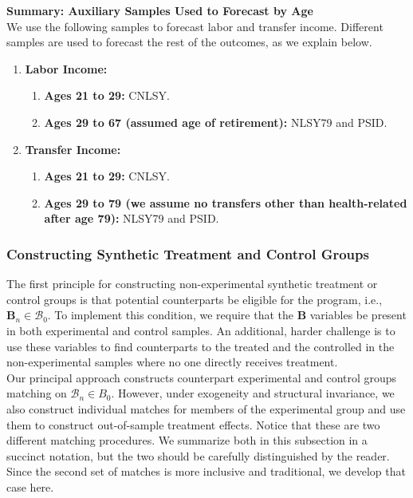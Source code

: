 \noindent \textbf{Summary: Auxiliary Samples Used to Forecast by Age}\\
We use the following samples to forecast labor and transfer income. Different samples are used to forecast the rest of the outcomes, as we explain below.
\begin{enumerate}
\item \textbf{Labor Income:}
\begin{enumerate}
\item \textbf{Ages 21 to 29:} CNLSY.
\item \textbf{Ages 29 to 67 (assumed age of retirement):} NLSY79 and PSID.
\end{enumerate}
\item \textbf{Transfer Income:}
\begin{enumerate}
\item \textbf{Ages 21 to 29:} CNLSY.
\item \textbf{Ages 29 to 79 (we assume no transfers other than health-related after age 79):} NLSY79 and PSID.
\end{enumerate}
\end{enumerate}

\subsubsection{Constructing Synthetic Treatment and Control Groups}\label{appendix:match}

\noindent The first principle for constructing non-experimental synthetic treatment or control groups is that potential counterparts be eligible for the program, i.e., $\bm{B}_n \in \mathcal{B}_{0}$. To implement this condition, we require that the $\bm{B}$ variables be present in both experimental and control samples. An additional, harder challenge is to use these variables to find counterparts to the treated and the controlled in the non-experimental samples where no one directly receives treatment.\\

\noindent Our principal approach constructs counterpart experimental and control groups matching on $\mathcal{B}_n \in B_0$. However, under exogeneity and structural invariance, we also construct individual matches for members of the experimental group and use them to construct out-of-sample treatment effects. Notice that these are two different matching procedures. We summarize both in this subsection in a succinct notation, but the two should be carefully distinguished by the reader. Since the second set of matches is more inclusive and traditional, we develop that case here.\\


